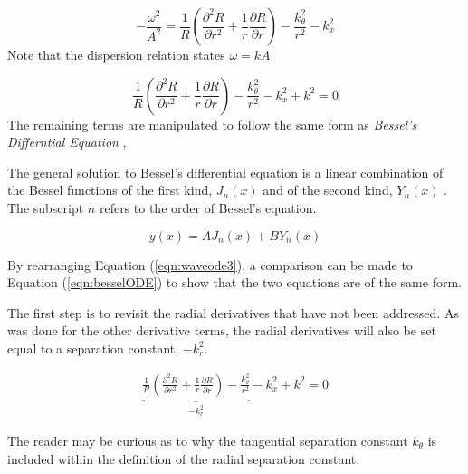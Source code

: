 \begin{equation}
    -\frac{\omega^2}{A^2}  = 
    \frac{1}{R}
    \left(      
    \frac{\partial^2 R}{\partial r^2 } +
    \frac{1}{r}\frac{\partial R}{\partial r}  
\right) -
    \frac{k_{\theta}^2}{r^2}-  
    k_x^2
    \label{eqn:waveode2}
\end{equation}
Note that the dispersion relation states $\omega = k A$

\begin{equation}
    \frac{1}{R}
    \left(      
    \frac{\partial^2 R}{\partial r^2 } +
    \frac{1}{r}\frac{\partial R}{\partial r}  
\right) -
    \frac{k_{\theta}^2}{r^2}-  
    k_x^2 + k^2 = 0
    \label{eqn:waveode3}
\end{equation}
The remaining terms are manipulated to follow the same form as \textit{Bessel's Differntial 
Equation} ,


The general solution to Bessel's differential equation is a linear combination of
the Bessel functions of the first kind, $J_n(x)$ and of the second kind, $Y_n(x)$ 
\cite{wolphram:bessel}. The subscript $n$ refers to the order of Bessel's equation.

\begin{equation}
    y(x) = AJ_n(x) + BY_n(x)
    \label{eqn:besselsolution}
\end{equation}

By rearranging Equation (\ref{eqn:waveode3}), a comparison can be made to Equation
(\ref{eqn:besselODE}) to show that the two equations are of the same form. 

The first step is to revisit the radial derivatives that have not been addressed.
As was done for the other derivative terms, the radial derivatives will also 
be set equal to a separation constant, $-k_r^2$. 

\begin{align}
    \underbrace{\frac{1}{R}
    \left(      
    \frac{\partial^2 R}{\partial r^2 } +
    \frac{1}{r}\frac{\partial R}{\partial r}  
\right) -
    \frac{k_{\theta}^2}{r^2}}_{-k_r^2}-  
    k_x^2 + k^2 = 0
    \label{eqn:wavenumber_without_kr}
\end{align}

The reader may be curious as to why the tangential separation constant $k_{\theta}$ is 
included within the definition of the radial separation constant. 

